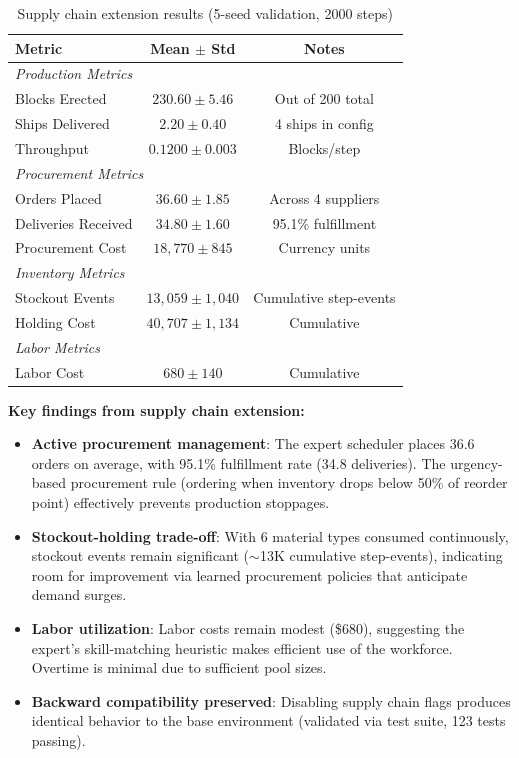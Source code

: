 \documentclass[11pt,a4paper]{article}
\begin{document}
\begin{table}[h]
\centering
\caption{Supply chain extension results (5-seed validation, 2000 steps)}
\label{tab:supply_chain_results}
\begin{tabular}{lcc}
\toprule
Metric & Mean $\pm$ Std & Notes \\
\midrule
\multicolumn{3}{l}{\textit{Production Metrics}} \\
Blocks Erected & $230.60 \pm 5.46$ & Out of 200 total \\
Ships Delivered & $2.20 \pm 0.40$ & 4 ships in config \\
Throughput & $0.1200 \pm 0.003$ & Blocks/step \\
\midrule
\multicolumn{3}{l}{\textit{Procurement Metrics}} \\
Orders Placed & $36.60 \pm 1.85$ & Across 4 suppliers \\
Deliveries Received & $34.80 \pm 1.60$ & 95.1\% fulfillment \\
Procurement Cost & $18{,}770 \pm 845$ & Currency units \\
\midrule
\multicolumn{3}{l}{\textit{Inventory Metrics}} \\
Stockout Events & $13{,}059 \pm 1{,}040$ & Cumulative step-events \\
Holding Cost & $40{,}707 \pm 1{,}134$ & Cumulative \\
\midrule
\multicolumn{3}{l}{\textit{Labor Metrics}} \\
Labor Cost & $680 \pm 140$ & Cumulative \\
\bottomrule
\end{tabular}
\end{table}

\textbf{Key findings from supply chain extension:}
\begin{itemize}
    \item \textbf{Active procurement management}: The expert scheduler places 36.6 orders on average, with 95.1\% fulfillment rate (34.8 deliveries). The urgency-based procurement rule (ordering when inventory drops below 50\% of reorder point) effectively prevents production stoppages.
    \item \textbf{Stockout-holding trade-off}: With 6 material types consumed continuously, stockout events remain significant ($\sim$13K cumulative step-events), indicating room for improvement via learned procurement policies that anticipate demand surges.
    \item \textbf{Labor utilization}: Labor costs remain modest (\$680), suggesting the expert's skill-matching heuristic makes efficient use of the workforce. Overtime is minimal due to sufficient pool sizes.
    \item \textbf{Backward compatibility preserved}: Disabling supply chain flags produces identical behavior to the base environment (validated via test suite, 123 tests passing).
\end{itemize}
\end{document}
